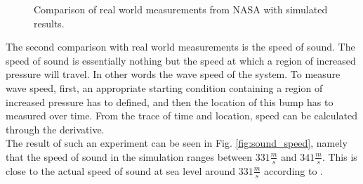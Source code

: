 \begin{figure}[!h]
    \caption{Comparison of real world measurements from NASA \cite{larson1963stratosphere} with simulated results.}
    \label{fig:cmp_nasa}
\end{figure}

The second comparison with real world measurements is the speed of sound.
The speed of sound is essentially nothing but the speed at which a region of increased pressure will travel.
In other words the wave speed of the system.
To measure wave speed, first, an appropriate starting condition containing a region of increased pressure has to defined, and then the location of this bump has to measured over time.
From the trace of time and location, speed can be calculated through the derivative.\\
The result of such an experiment can be seen in Fig. \ref{fig:sound_speed}, namely that the speed of sound in the simulation ranges between $331\frac{m}{s}$ and $341\frac{m}{s}$.
This is close to the actual speed of sound at sea level around $331\frac{m}{s}$ according to \cite{hardy1942velocity}.

